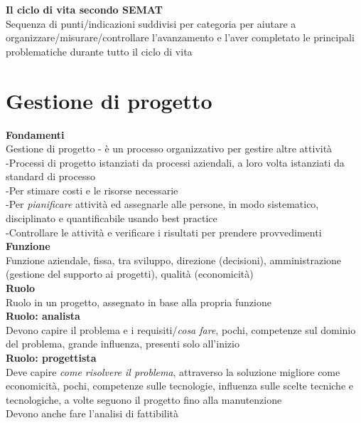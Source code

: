 \documentclass{article}
\begin{document}
		\textbf{Il ciclo di vita secondo SEMAT}\\
		Sequenza di punti/indicazioni suddivisi per categoria per aiutare a organizzare/misurare/controllare l'avanzamento e l'aver completato le principali problematiche durante tutto il ciclo di vita\\
		
		
	\clearpage
	\section{Gestione di progetto}
		\textbf{Fondamenti}\\
		Gestione di progetto - è un processo organizzativo per gestire altre attività\\
		-Processi di progetto istanziati da processi aziendali, a loro volta istanziati da standard di processo\\
		-Per stimare costi e le risorse necessarie\\
		-Per \textit{pianificare} attività ed assegnarle alle persone, in modo sistematico, disciplinato e quantificabile usando best practice\\
		-Controllare le attività e verificare i risultati per prendere provvedimenti\\
		
		\textbf{Funzione}\\
		Funzione aziendale, fissa, tra sviluppo, direzione (decisioni), amministrazione (gestione del supporto ai progetti), qualità (economicità)\\
		
		\textbf{Ruolo}\\
		Ruolo in un progetto, assegnato in base alla propria funzione\\
		
		\textbf{Ruolo: analista}\\
		Devono capire il problema e i requisiti/\textit{cosa fare}, pochi, competenze sul dominio del problema, grande influenza, presenti solo all'inizio\\
		
		\textbf{Ruolo: progettista}\\
		Deve capire \textit{come risolvere il problema}, attraverso la soluzione migliore come economicità, pochi, competenze sulle tecnologie, influenza sulle scelte tecniche e tecnologiche, a volte seguono il progetto fino alla manutenzione\\
		Devono anche fare l'analisi di fattibilità\\
		
\end{document}
